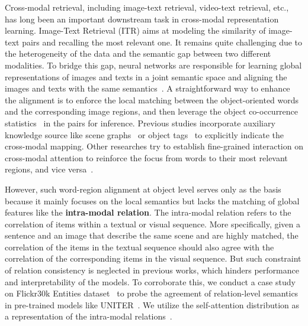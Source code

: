 \documentclass[11pt,a4paper]{article}
\begin{document}
Cross-modal retrieval, including image-text retrieval, video-text retrieval, etc., has long been an important downstream task in cross-modal representation learning. 
Image-Text Retrieval (ITR)
aims at modeling the similarity of image-text pairs and recalling the most relevant one.
It remains quite challenging due to the heterogeneity of the data and the semantic gap between two different modalities. 
To bridge this gap, neural networks are responsible for learning global representations of images and texts in a joint semantic space and aligning the images and texts with the same semantics~\citep{VSE++, Unifying-Visual-Semantic}. 
A straightforward way to enhance the alignment is to enforce the local matching between the object-oriented words and the corresponding image regions, and then leverage the object co-occurrence statistics~\cite{Graph-Structured-Network, Denotation-Graph} in the pairs for inference. 
Previous studies incorporate auxiliary knowledge source like scene graphs~\cite{ERNIE-ViL} or object tags~\cite{Oscar} to explicitly indicate the cross-modal mapping.
Other researches try to establish fine-grained interaction on cross-modal attention to reinforce the focus from words to their most relevant regions, and vice versa~\cite{UNITER, CAMP, TERAN, SCAN, DCA, Visual-Agreement}.

However, such word-region alignment at object level serves only as the basis because it mainly focuses on the local semantics but lacks the matching of global features like the \textbf{intra-modal relation}. 
The intra-modal relation refers to the correlation of items within a textual or visual sequence. 
More specifically, given a sentence and an image that describe the same scene and are highly matched, the correlation of the items in the textual sequence should also agree with the correlation of the corresponding items in the visual sequence. 
But such constraint of relation consistency is neglected in previous works, which hinders performance and interpretability of the models.
To corroborate this, we conduct a case study on Flickr30k Entities dataset~\cite{Flickr30k-Entities} to probe the agreement of relation-level semantics in pre-trained models like UNITER~\cite{UNITER}. 
We utilize the self-attention distribution as a representation of the intra-modal relations~\cite{What-Does-BERT-Look-At, Do-Attention-Heads-Track-Syntactic-Dependencies, Revealing-the-Dark-Secrets-of-BERT}. 
\end{document}
